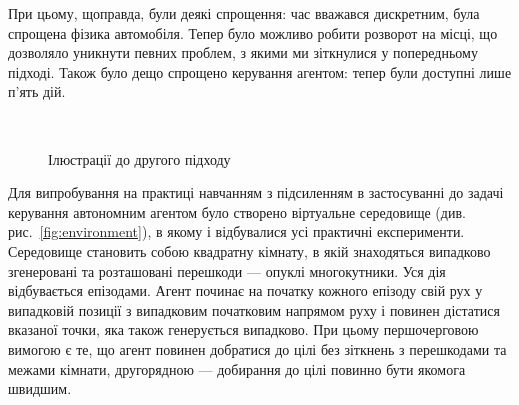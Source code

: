 \documentclass[a4paper,10pt,fleqn]{article}
\begin{document}
При цьому, щоправда, були деякі спрощення: час вважався дискретним, була спрощена фізика автомобіля. Тепер було можливо робити розворот на місці, що дозволяло уникнути певних проблем, з якими ми зіткнулися у попередньому підході. Також було дещо спрощено керування агентом: тепер були доступні лише п'ять дій.

\begin{figure}
  \centering
  \,
  \,
  \caption{Ілюстрації до другого підходу}
  \label{fig:second-approach}
\end{figure}

Для випробування на практиці навчанням з підсиленням в застосуванні до задачі керування автономним агентом було створено віртуальне середовище (див. рис.~\ref{fig:environment}), в якому і відбувалися усі практичні експерименти. Середовище становить собою квадратну кімнату, в якій знаходяться випадково згенеровані та розташовані перешкоди --- опуклі многокутники. Уся дія відбувається епізодами. Агент починає на початку кожного епізоду свій рух у випадковій позиції з випадковим початковим напрямом руху і повинен дістатися вказаної точки, яка також генерується випадково. При цьому першочерговою вимогою є те, що агент повинен добратися до цілі без зіткнень з перешкодами та межами кімнати, другорядною --- добирання до цілі повинно бути якомога швидшим.
\end{document}
